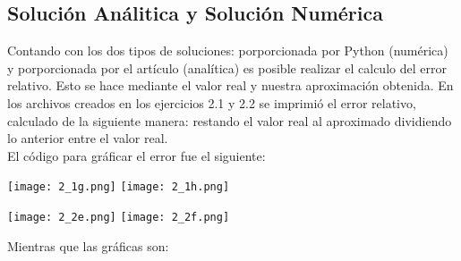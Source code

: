 \documentclass[12pt]{article}
\begin{document}
\subsection*{Solución Análitica y Solución Numérica}
Contando con los dos tipos de soluciones: porporcionada por Python (numérica) y porporcionada por el artículo (analítica) es posible realizar el calculo del error relativo. Esto se hace mediante el valor real y nuestra aproximación obtenida. En los archivos creados en los ejercicios 2.1 y 2.2 se imprimió el error relativo, calculado de la siguiente manera: restando el valor real al aproximado dividiendo lo anterior entre el valor real.\\
El código para gráficar el error fue el siguiente:
\begin{center}
    \texttt{[image: 2\_1g.png]}\hspace*{\fill}
    \texttt{[image: 2\_1h.png]}\\
\end{center}
\begin{center}
    \texttt{[image: 2\_2e.png]}\hspace*{\fill}
    \texttt{[image: 2\_2f.png]}\\
\end{center}
Mientras que las gráficas son:
\end{document}

